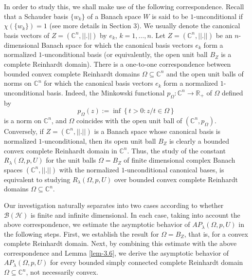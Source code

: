 \documentclass[a4paper,11pt, reqno]{amsart}
\theoremstyle{definition}
\begin{document}
In order to study this, we shall make use of the following correspondence.  Recall that a Schauder basis $\{w_{k}\}$ of a Banach space $W$ is said to be $1$-unconditional if $\chi(\{w_k\})=1$ (see more details in Section $3$). We usually denote the canonical basis vectors of $Z=(\mathbb{C}^n, ||.||)$ by $e_{k}$, $k=1, \ldots,n$. 
  Let $Z=(\mathbb{C}^n, ||.||)$ be an $n$-dimensional Banach space for which the canonical basis vectors $e_{k}$ form a normalized $1$-unconditional basis (or equivalently, the open unit ball $B_{Z}$ is a complete Reinhardt domain). There is a one-to-one correspondence between bounded convex complete Reinhardt domains $\Omega \subseteq\mathbb{C}^n$ and the open unit balls of norms on $\mathbb{C}^n$ for which the canonical basis vectors $e_{k}$ form a normalized $1$-unconditional basis. Indeed, the Minkowski functional $p_{\Omega}:\mathbb{C}^n \rightarrow \mathbb{R}_{+}$ of $\Omega$ defined by $$p_{\Omega}(z):= \inf \left\{t>0 : z/t \in \Omega\right\}$$
	is a norm on $\mathbb{C}^n$, and $\Omega$ coincides with the open unit ball of $(\mathbb{C}^n,p_{\Omega})$. Conversely, if $Z=(\mathbb{C}^n, ||.||)$ is a Banach space whose canonical basis is normalized $1$-unconditional, then its open unit ball $B_{	Z}$ is clearly a bounded convex complete Reinhardt domain in $\mathbb{C}^n$. Thus, the study of the constant $R_{\lambda}(\Omega, p,U)$ for the unit balls $\Omega=B_{Z}$ of finite dimensional complex Banach spaces $(\mathbb{C}^n, ||.||)$ with the normalized $1$-unconditional canonical bases, is equivalent to studying $R_{\lambda}(\Omega, p,U)$ over bounded convex complete Reinhardt domains $\Omega \subseteq\mathbb{C}^n$.
	
	Our investigation naturally separates into two cases according to whether $\mathcal{B}(\mathcal{H})$ is finite and infinite dimensional. In each case, taking into account the above correspondence, we estimate the asymptotic behavior of $AP_{\lambda}(\Omega, p,U)$ in the following steps. First, we establish the result for $\Omega=B_{Z}$, that is, for a convex complete Reinhardt domain. Next, by combining this estimate with the above correspondence and Lemma \ref{lem-3.6}, we derive the asymptotic behavior of $AP_{\lambda}(\Omega, p,U)$ for every bounded simply connected complete Reinhardt domain $\Omega \subseteq \mathbb{C}^n$, not necessarily convex.
	
\end{document}
